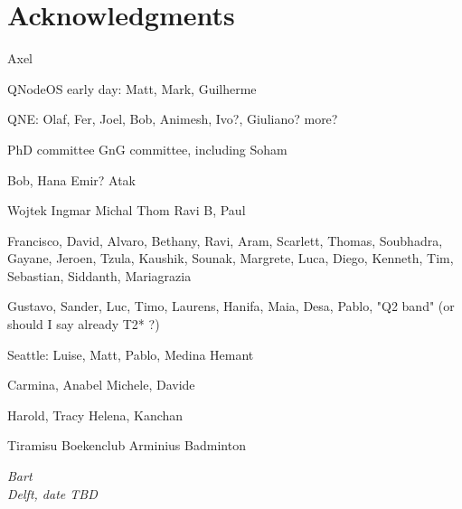 \chapter*{Acknowledgments}

\todo{}
Axel

QNodeOS early day: Matt, Mark, Guilherme

QNE: Olaf, Fer, Joel, Bob, Animesh, Ivo?, Giuliano? more?

PhD committee
GnG committee, including Soham

Bob, Hana
Emir?
Atak

Wojtek
Ingmar
Michal
Thom
Ravi B, Paul

Francisco, David, Alvaro, Bethany, Ravi, Aram, Scarlett, Thomas, Soubhadra, Gayane, Jeroen, Tzula, Kaushik, Sounak, Margrete, Luca, Diego, Kenneth, Tim, Sebastian, Siddanth, 
Mariagrazia

Gustavo, Sander, Luc, Timo, Laurens, Hanifa, Maia, Desa, Pablo, "Q2 band" (or should I say already T2* ?)

Seattle: Luise, Matt, Pablo, Medina
Hemant

Carmina, Anabel
Michele, Davide

Harold, Tracy
Helena, Kanchan

Tiramisu
Boekenclub
Arminius
Badminton


\begin{flushright}
{\itshape
Bart \\
Delft, date TBD
}
\end{flushright}
